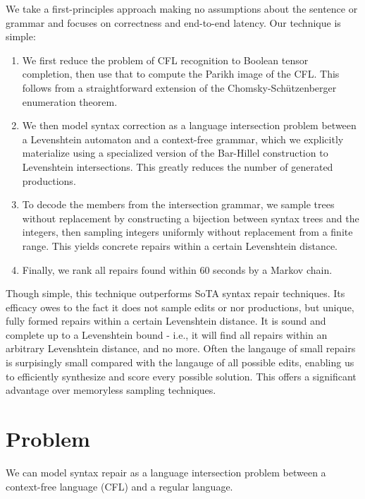\documentclass[sigplan,review,anonymous,acmsmall]{acmart}\settopmatter{printfolios=false,printccs=false,printacmref=false}
\begin{document}
  We take a first-principles approach making no assumptions about the sentence or grammar and focuses on correctness and end-to-end latency. Our technique is simple:

  \begin{enumerate}
    \item We first reduce the problem of CFL recognition to Boolean tensor completion, then use that to compute the Parikh image of the CFL. This follows from a straightforward extension of the Chomsky-Sch\"utzenberger enumeration theorem.
    \item We then model syntax correction as a language intersection problem between a Levenshtein automaton and a context-free grammar, which we explicitly materialize using a specialized version of the Bar-Hillel construction to Levenshtein intersections. This greatly reduces the number of generated productions.
    \item To decode the members from the intersection grammar, we sample trees without replacement by constructing a bijection between syntax trees and the integers, then sampling integers uniformly without replacement from a finite range. This yields concrete repairs within a certain Levenshtein distance.
    \item Finally, we rank all repairs found within 60 seconds by a Markov chain.
  \end{enumerate}

  Though simple, this technique outperforms SoTA syntax repair techniques. Its efficacy owes to the fact it does not sample edits or nor productions, but unique, fully formed repairs within a certain Levenshtein distance. It is sound and complete up to a Levenshtein bound - i.e., it will find all repairs within an arbitrary Levenshtein distance, and no more. Often the langauge of small repairs is surpisingly small compared with the langauge of all possible edits, enabling us to efficiently synthesize and score every possible solution. This offers a significant advantage over memoryless sampling techniques.

  \pagebreak

  


  \section{Problem}

  We can model syntax repair as a language intersection problem between a context-free language (CFL) and a regular language.
\end{document}
